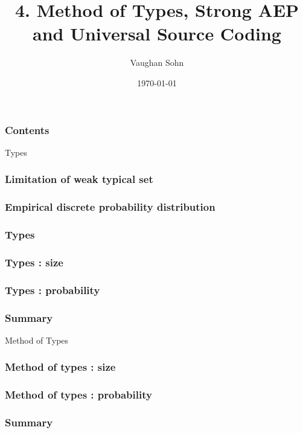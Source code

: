 \documentclass[9pt]{beamer}
\title{4. Method of Types, Strong AEP and Universal Source Coding}
\date{\today}
\author{Vaughan Sohn}
\begin{document}
    \maketitle
    
    \begin{frame}
        \frametitle{Contents}
        \tableofcontents
    \end{frame}
    


    \begin{section}{Types}
        \begin{frame}
            \frametitle{Limitation of weak typical set}
            
        \end{frame}

        \begin{frame}
            \frametitle{Empirical discrete probability distribution}
            
        \end{frame}

        \begin{frame}
            \frametitle{Types}
            
        \end{frame}


        \begin{frame}
            \frametitle{Types : size}
            
        \end{frame}

        \begin{frame}
            \frametitle{Types : probability}
            
        \end{frame}


        \begin{frame}
            \frametitle{Summary}
            
        \end{frame}
    \end{section}




    \begin{section}{Method of Types}
        \begin{frame}
            \frametitle{Method of types : size}
            
        \end{frame}

        \begin{frame}
            \frametitle{Method of types : probability}
            
        \end{frame}

        \begin{frame}
            \frametitle{Summary}
            
        \end{frame}
    \end{section}
\end{document}
